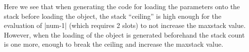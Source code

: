 \documentclass[paper=a4, fontsize=11pt]{scrartcl} %
\numberwithin{equation}{section} %
\numberwithin{figure}{section} %
\numberwithin{table}{section} %
\begin{document}
Here we see that when generating the code for loading the parameters onto the stack before loading the object, the stack “ceiling” is high enough for the evaluation of |num-1| (which requires 2 slots) to not increase the maxstack value. However, when the loading of the object is generated beforehand the stack count is one more, enough to break the ceiling and increase the maxstack value.\\
\end{document}
